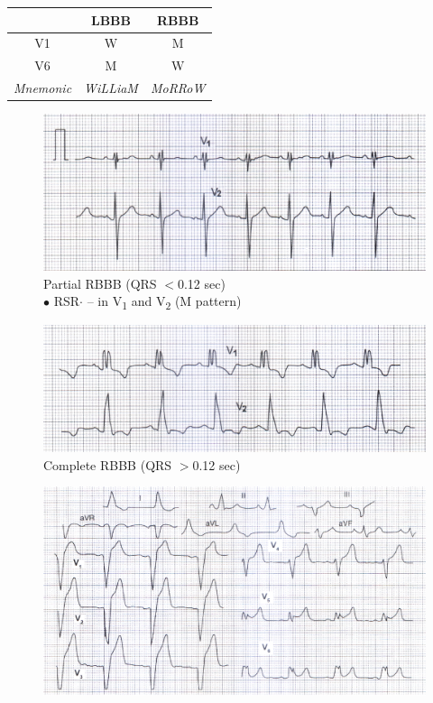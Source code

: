 \documentclass[11pt,a4paper]{report}
\begin{document}
\begin{enumerate}
\begin{enumerate}
\begin{center}
			\begin{tabular}{c|c|c} 
				\toprule[1.5pt]
				& \textbf{LBBB} & \textbf{RBBB} \\ 
				\midrule
				V1 	& W & M \\
				V6	& M & W \\
				\midrule
				\textit{Mnemonic} & \textit{WiLLiaM} & \textit{MoRRoW} \\
				\bottomrule[1.5pt]
			\end{tabular}
		\end{center}
	\end{enumerate}
	\begin{figure}[htp]
		\centering \includegraphics[scale=1.0]{ecg-rbbb-part.png}
		\centering \caption[Partial RBBB]{Partial RBBB (QRS $<$0.12 sec) \\ $\bullet$ RSR$\cdot$ -- in V\textsubscript{1} and V\textsubscript{2} (M pattern) \cite{abdullah-ecg}}
		\label{ecg-rbbb-part}
	\end{figure}
	\begin{figure}[htp]
		\centering \includegraphics[scale=1.0]{ecg-rbbb-complete.png}
		\centering \caption[Complete RBBB]{Complete RBBB (QRS $>$0.12 sec) \cite{abdullah-ecg}}
		\label{ecg-rbbb-complete}
	\end{figure}
	\begin{figure}[htp]
		\centering \includegraphics[scale=1.0]{ecg-lbbb.png}

\end{figure}
\end{enumerate}
\end{document}
